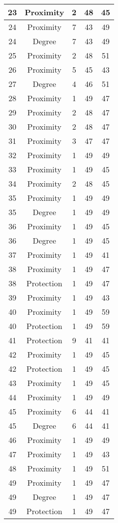 \documentclass[results.tex]{subfiles}
\begin{document}
\begin{center}
\begin{tabular}{| c || c | c | c | c |}
    \hline
    23 & Proximity & 2 & 48 & 45 \\ 
    \hline
    24 & Proximity & 7 & 43 & 49 \\ 
    \hline
    24 & Degree & 7 & 43 & 49 \\ 
    \hline
    25 & Proximity & 2 & 48 & 51 \\ 
    \hline
    26 & Proximity & 5 & 45 & 43 \\ 
    \hline
    27 & Degree & 4 & 46 & 51 \\ 
    \hline
    28 & Proximity & 1 & 49 & 47 \\ 
    \hline
    29 & Proximity & 2 & 48 & 47 \\ 
    \hline
    30 & Proximity & 2 & 48 & 47 \\ 
    \hline
    31 & Proximity & 3 & 47 & 47 \\ 
    \hline
    32 & Proximity & 1 & 49 & 49 \\ 
    \hline
    33 & Proximity & 1 & 49 & 45 \\ 
    \hline
    34 & Proximity & 2 & 48 & 45 \\ 
    \hline
    35 & Proximity & 1 & 49 & 49 \\ 
    \hline
    35 & Degree & 1 & 49 & 49 \\ 
    \hline
    36 & Proximity & 1 & 49 & 45 \\ 
    \hline
    36 & Degree & 1 & 49 & 45 \\ 
    \hline
    37 & Proximity & 1 & 49 & 41 \\ 
    \hline
    38 & Proximity & 1 & 49 & 47 \\ 
    \hline
    38 & Protection & 1 & 49 & 47 \\ 
    \hline
    39 & Proximity & 1 & 49 & 43 \\ 
    \hline
    40 & Proximity & 1 & 49 & 59 \\ 
    \hline
    40 & Protection & 1 & 49 & 59 \\ 
    \hline
    41 & Protection & 9 & 41 & 41 \\ 
    \hline
    42 & Proximity & 1 & 49 & 45 \\ 
    \hline
    42 & Protection & 1 & 49 & 45 \\ 
    \hline
    43 & Proximity & 1 & 49 & 45 \\ 
    \hline
    44 & Proximity & 1 & 49 & 49 \\ 
    \hline
    45 & Proximity & 6 & 44 & 41 \\ 
    \hline
    45 & Degree & 6 & 44 & 41 \\ 
    \hline
    46 & Proximity & 1 & 49 & 49 \\ 
    \hline
    47 & Proximity & 1 & 49 & 43 \\ 
    \hline
    48 & Proximity & 1 & 49 & 51 \\ 
    \hline
    49 & Proximity & 1 & 49 & 47 \\ 
    \hline
    49 & Degree & 1 & 49 & 47 \\ 
    \hline
    49 & Protection & 1 & 49 & 47 \\ 
    \hline   \end{tabular}
\end{center}
\end{document}
